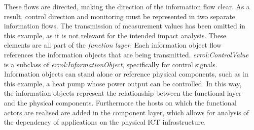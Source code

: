 These flows are directed, making the direction of the information flow clear.
As a result, control direction and monitoring must be represented in two separate information flows.
The transmission of measurement values has been omitted in this example, as it is not relevant for the intended impact analysis.
These elements are all part of the \textit{function layer}.
Each information object flow references the information objects that are being transmitted.
\textit{errol:ControlValue} is a subclass of \textit{errol:InformationObject}, specifically for control signals.
Information objects can stand alone or reference physical components, such as in this example, a heat pump whose power output can be controlled.
In this way, the information objects represent the relationship between the functional layer and the physical components.
Furthermore the hosts on which the functional actors are realised are added in the component layer, which allows for analysis of the dependency of applications on the physical \ac{ICT} infrastructure.

